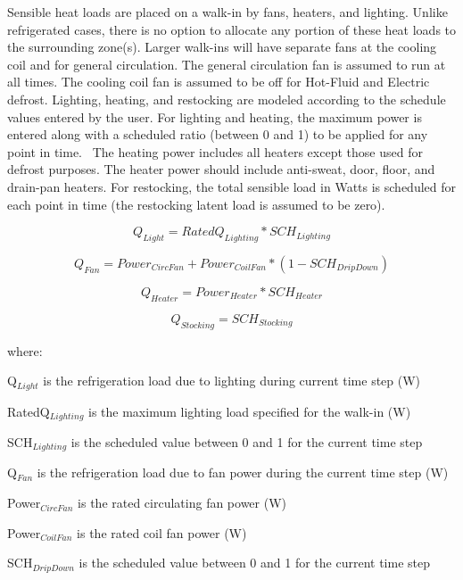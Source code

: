 Sensible heat loads are placed on a walk-in by fans, heaters, and lighting. Unlike refrigerated cases, there is no option to allocate any portion of these heat loads to the surrounding zone(s). Larger walk-ins will have separate fans at the cooling coil and for general circulation. The general circulation fan is assumed to run at all times. The cooling coil fan is assumed to be off for Hot-Fluid and Electric defrost. Lighting, heating, and restocking are modeled according to the schedule values entered by the user. For lighting and heating, the maximum power is entered along with a scheduled ratio (between 0 and 1) to be applied for any point in time.~ The heating power includes all heaters except those used for defrost purposes. The heater power should include anti-sweat, door, floor, and drain-pan heaters. For restocking, the total sensible load in Watts is scheduled for each point in time (the restocking latent load is assumed to be zero).

\begin{equation}
Q_{Light} = RatedQ_{Lighting} * SCH_{Lighting}
\end{equation}

\begin{equation}
Q_{Fan} = Power_{CircFan} + Power_{CoilFan} * ( 1 - SCH_{DripDown} )
\end{equation}

\begin{equation}
Q_{Heater} = Power_{Heater} * SCH_{Heater}
\end{equation}

\begin{equation}
Q_{Stocking} = SCH_{Stocking}
\end{equation}

where:

Q\(_{Light}\) is the refrigeration load due to lighting during current time step (W)

RatedQ\(_{Lighting}\) is the maximum lighting load specified for the walk-in (W)

SCH\(_{Lighting}\) is the scheduled value between 0 and 1 for the current time step

Q\(_{Fan}\) is the refrigeration load due to fan power during the current time step (W)

Power\(_{CircFan}\) is the rated circulating fan power (W)

Power\(_{CoilFan}\) is the rated coil fan power (W)

SCH\(_{DripDown}\) is the scheduled value between 0 and 1 for the current time step

